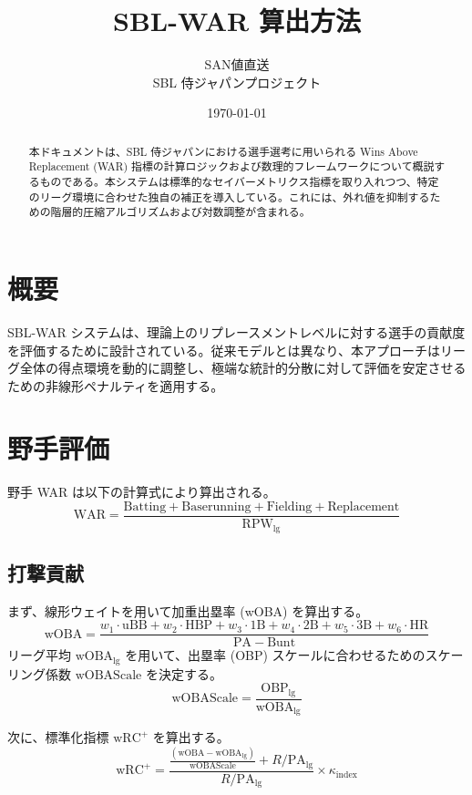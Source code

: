 \documentclass[uplatex,a4paper,11pt,dvipdfmx]{jsarticle}
\title{\textbf{SBL-WAR 算出方法}}
\author{SAN値直送 \\ \small SBL 侍ジャパンプロジェクト}
\date{\today}
\newcommand{\mvar}[1]{\mathrm{#1}}
\begin{document}
\maketitle

\begin{abstract}
本ドキュメントは、SBL 侍ジャパンにおける選手選考に用いられる Wins Above Replacement (WAR) 指標の計算ロジックおよび数理的フレームワークについて概説するものである。本システムは標準的なセイバーメトリクス指標を取り入れつつ、特定のリーグ環境に合わせた独自の補正を導入している。これには、外れ値を抑制するための階層的圧縮アルゴリズムおよび対数調整が含まれる。
\end{abstract}

\section{概要}
SBL-WAR システムは、理論上のリプレースメントレベルに対する選手の貢献度を評価するために設計されている。従来モデルとは異なり、本アプローチはリーグ全体の得点環境を動的に調整し、極端な統計的分散に対して評価を安定させるための非線形ペナルティを適用する。

\section{野手評価}
野手 WAR は以下の計算式により算出される。
\begin{equation}
\mvar{WAR} = \frac{\mvar{Batting} + \mvar{Baserunning} + \mvar{Fielding} + \mvar{Replacement}}{\mvar{RPW}_{\text{lg}}}
\end{equation}

\subsection{打撃貢献}
まず、線形ウェイトを用いて加重出塁率 (wOBA) を算出する。
\begin{equation}
\mvar{wOBA} = \frac{w_1 \cdot \mvar{uBB} + w_2 \cdot \mvar{HBP} + w_3 \cdot \mvar{1B} + w_4 \cdot \mvar{2B} + w_5 \cdot \mvar{3B} + w_6 \cdot \mvar{HR}}{\mvar{PA} - \mvar{Bunt}}
\end{equation}
リーグ平均 $\mvar{wOBA}_{\text{lg}}$ を用いて、出塁率 (OBP) スケールに合わせるためのスケーリング係数 $\mvar{wOBAScale}$ を決定する。
\begin{equation}
\mvar{wOBAScale} = \frac{\mvar{OBP}_{\text{lg}}}{\mvar{wOBA}_{\text{lg}}}
\end{equation}

次に、標準化指標 $\mvar{wRC}^+$ を算出する。
\begin{equation}
\mvar{wRC}^+ = \frac{\frac{(\mvar{wOBA} - \mvar{wOBA}_{\text{lg}})}{\mvar{wOBAScale}} + R/\mvar{PA}_{\text{lg}}}{R/\mvar{PA}_{\text{lg}}} \times \kappa_{\text{index}}
\end{equation}
\end{document}
